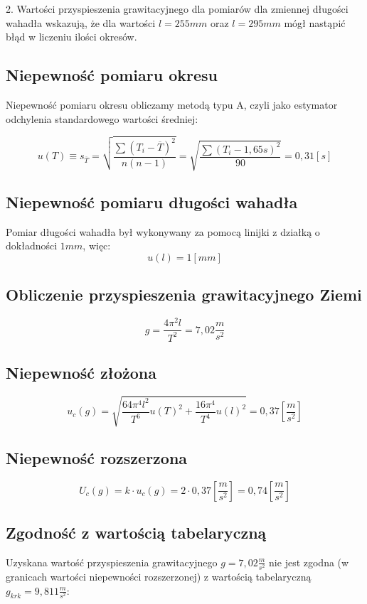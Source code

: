 \documentclass[a4paper,10pt,twoside]{article}
\begin{document}
2. Wartości przyspieszenia grawitacyjnego dla pomiarów dla zmiennej długości wahadła wskazują, że dla wartości $l=255mm$ oraz $l=295mm$ mógł nastąpić błąd w liczeniu ilości okresów.

\subsection{Niepewność pomiaru okresu}

Niepewność pomiaru okresu obliczamy metodą typu A, czyli jako estymator odchylenia standardowego wartości średniej:

$$u(T)\equiv s_{\overline{T}} = \sqrt{\frac{\sum{(T_i-\overline{T})^2}}{n(n-1)}} = \sqrt{\frac{\sum{(T_i-1,65s)^2}}{90}} = 0,31 [s] $$

\subsection{Niepewność pomiaru długości wahadła}
Pomiar długości wahadła był wykonywany za pomocą linijki z działką o dokładności $1mm$, więc:
$$u(l)=1 [mm]$$

\subsection{Obliczenie przyspieszenia grawitacyjnego Ziemi}

$$g = \frac{4\pi^2l}{T^2} = 7,02 \frac{m}{s^2}$$

\subsection{Niepewność złożona}

$$u_c(g)=\sqrt{\frac{64\pi^4 l^2}{T^6}u(T)^2+\frac{16\pi^4}{T^4}u(l)^2} =  0,37 [\frac{m}{s^2}]$$

\subsection{Niepewność rozszerzona}

$$U_c(g) = k \cdot u_c(g) = 2 \cdot 0,37 [\frac{m}{s^2}] = 0,74 [\frac{m}{s^2}] $$

\subsection{Zgodność z wartością tabelaryczną}

Uzyskana wartość przyspieszenia grawitacyjnego $g = 7,02 \frac{m}{s^2}$ nie jest zgodna (w granicach wartości niepewności rozszerzonej) z wartością tabelaryczną $g_{krk} = 9,811 \frac{m}{s^2}$:
\end{document}
